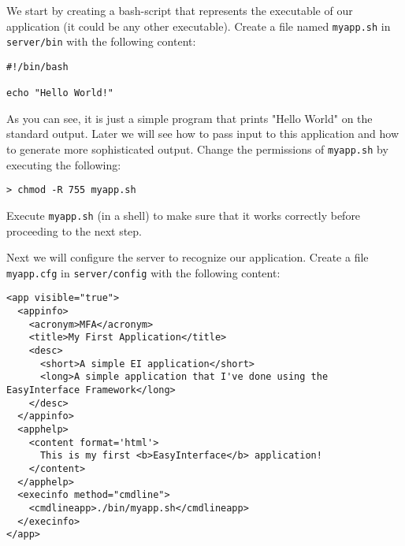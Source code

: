 We start by creating a bash-script that represents the executable of
our application (it could be any other executable). Create a file
named \texttt{myapp.sh} in \texttt{server/bin} with the following
content:

\medskip
\begin{lstlisting}[style=script]
#!/bin/bash

echo "Hello World!"
\end{lstlisting}

\medskip
\noindent
As you can see, it is just a simple program that prints "Hello World"
on the standard output. Later we will see how to pass input to this
application and how to generate more sophisticated output.
%
Change the permissions of \texttt{myapp.sh} by executing the
following:

\medskip
\begin{lstlisting}
> chmod -R 755 myapp.sh
\end{lstlisting}

\medskip
\noindent
Execute \texttt{myapp.sh} (in a shell) to make sure that it works
correctly before proceeding to the next step.

Next we will configure the server to recognize our application.
%
Create a file \texttt{myapp.cfg} in \texttt{server/config} with the
following content:

\medskip
\begin{lstlisting}
<app visible="true">
  <appinfo>
    <acronym>MFA</acronym>
    <title>My First Application</title>
    <desc>
      <short>A simple EI application</short>
      <long>A simple application that I've done using the EasyInterface Framework</long>
    </desc>
  </appinfo>
  <apphelp>
    <content format='html'>
      This is my first <b>EasyInterface</b> application!
    </content>
  </apphelp>
  <execinfo method="cmdline">
    <cmdlineapp>./bin/myapp.sh</cmdlineapp>
  </execinfo>
</app>
\end{lstlisting}

